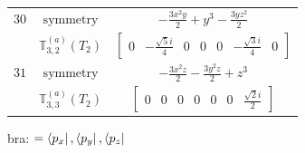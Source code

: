 \documentclass[fleqn,8pt,landscape]{jsarticle}
\begin{document}
\begin{longtable}{ccc}
$ 30 $ & $ \text{symmetry} $ & $ - \frac{3 x^{2} y}{2} + y^{3} - \frac{3 y z^{2}}{2} $ \\
$  $ & $ \mathbb{T}_{3,2}^{(a)}(T_{2}) $ & $ \begin{bmatrix} 0 & - \frac{\sqrt{5} i}{4} & 0 & 0 & 0 & - \frac{\sqrt{3} i}{4} & 0 \end{bmatrix} $ \\ \hline
$ 31 $ & $ \text{symmetry} $ & $ - \frac{3 x^{2} z}{2} - \frac{3 y^{2} z}{2} + z^{3} $ \\
$  $ & $ \mathbb{T}_{3,3}^{(a)}(T_{2}) $ & $ \begin{bmatrix} 0 & 0 & 0 & 0 & 0 & 0 & \frac{\sqrt{2} i}{2} \end{bmatrix} $ \\ \hline
\end{longtable}
bra: $=\bra{p_{x}}, \bra{p_{y}}, \bra{p_{z}}$
\end{document}
